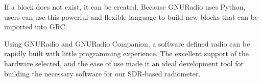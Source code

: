 If a block does not exist, it can be created.  Because GNURadio uses Python, users can use this powerful and flexible language to build new blocks that can be imported into GRC.    

Using GNURadio and GNURadio Companion, a software defined radio can be rapidly built with little programming experience.  The excellent support of the hardware selected, and the ease of use made it an ideal development tool for building the necessary software for our SDR-based radiometer.

